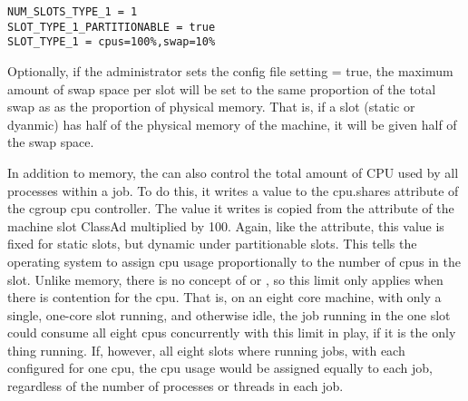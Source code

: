 \begin{verbatim}
NUM_SLOTS_TYPE_1 = 1
SLOT_TYPE_1_PARTITIONABLE = true
SLOT_TYPE_1 = cpus=100%,swap=10%
\end{verbatim}

Optionally, if the administrator sets the config file setting
 = true, the maximum amount 
of swap space per slot will be set to the same proportion of the total
swap as as the proportion of physical memory.  That is, if a slot
(static or dyanmic) has half of the physical memory of the machine,
it will be given half of the swap space.

In addition to memory, the  can also control 
the total amount of CPU used by all processes within a job.
To do this, it writes a value
to the cpu.shares attribute of the cgroup cpu controller.  
The value it writes is copied from the  attribute 
of the machine slot ClassAd multiplied by 100.
Again, like the  attribute, this value is fixed for static slots,
but dynamic under partitionable slots.  
This tells the operating system
to assign cpu usage proportionally to the number of cpus in the slot.  
Unlike memory, 
there is no concept of  or , 
so this limit only applies when there is contention for the cpu.
That is, on an eight core machine, with
only a single, one-core slot running, and otherwise idle, the job running
in the one slot could consume all eight cpus concurrently with this limit
in play, if it is the only thing running.  
If, however, all eight slots where running jobs, 
with each configured for one cpu, the cpu usage would be assigned
equally to each job, regardless of the number of processes or threads in each job.

